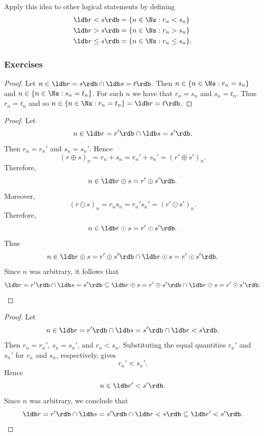 Apply this idea to other logical statements by defining
\begin{align*}
    \ldb r < s \rdb & = \{ n \in \Ns : r_n < s_n \} \\
    \ldb r > s \rdb & = \{ n \in \Ns : r_n > s_n \} \\
    \ldb r \leq s \rdb & = \{ n \in \Ns : r_n \leq s_n \}.
\end{align*}

\subsubsection{Exercises}

 \label{prop:transitive property of agreement sets}
\begin{proof}
    Let $n \in \ldb r=s\rdb \cap \ldb s=t\rdb$. Then $n \in \{ n \in \Ns : r_n = s_n \}$ and $n \in \{ n \in \Ns : s_n = t_n \}$. For such $n$ we have that $r_n=s_n$ and $s_n = t_n$. Thus $r_n=t_n$ and so $n \in \{ n \in \Ns : r_n = t_n \} = \ldb r=t \rdb$. 
\end{proof}

 \label{prop:ring congruence}
\begin{proof}
    Let
    \[
    n \in \ldb r=r'\rdb \cap \ldb s=s'\rdb.
    \]
    Then \(r_n=r_n'\) and \(s_n=s_n'\). Hence
    \[
    (r\oplus s)_n
    =
    r_n+s_n
    =
    r_n'+s_n'
    =
    (r'\oplus s')_n.
    \]
    Therefore,
    \[
    n \in \ldb r\oplus s=r'\oplus s'\rdb.
    \]
    Moreover,
    \[
    (r\odot s)_n
    =
    r_ns_n
    =
    r_n's_n'
    =
    (r'\odot s')_n.
    \]
    Therefore,
    \[
    n \in \ldb r\odot s=r'\odot s'\rdb.
    \]
    Thus
    \[
    n \in
    \ldb r\oplus s=r'\oplus s'\rdb
    \cap
    \ldb r\odot s=r'\odot s'\rdb.
    \]
    Since \(n\) was arbitrary, it follows that
    \[
    \ldb r=r'\rdb \cap \ldb s=s'\rdb
    \subseteq
    \ldb r\oplus s=r'\oplus s'\rdb
    \cap
    \ldb r\odot s=r'\odot s'\rdb.
    \]
\end{proof}


\prop{
\[
\ldb r=r'\rdb
\cap
\ldb s=s'\rdb
\cap
\ldb r<s\rdb
\subseteq
\ldb r'<s'\rdb.
\]
}
\begin{proof}
    Let
    \[
    n \in
    \ldb r=r'\rdb
    \cap
    \ldb s=s'\rdb
    \cap
    \ldb r<s\rdb.
    \]
    Then \(r_n=r_n'\), \(s_n=s_n'\), and \(r_n<s_n\). Substituting the
    equal quantities \(r_n'\) and \(s_n'\) for \(r_n\) and \(s_n\),
    respectively, gives
    \[
    r_n' < s_n'.
    \]
    Hence
    \[
    n \in \ldb r'<s'\rdb.
    \]
    Since \(n\) was arbitrary, we conclude that
    \[
    \ldb r=r'\rdb
    \cap
    \ldb s=s'\rdb
    \cap
    \ldb r<s\rdb
    \subseteq
    \ldb r'<s'\rdb.
    \]
\end{proof}



